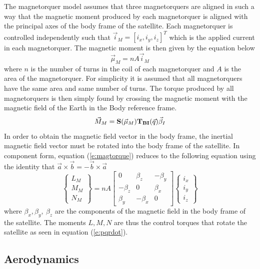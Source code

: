 The magnetorquer model assumes that three magnetorquers are aligned in
such a way that the magnetic moment produced by each magnetorquer is
aligned with the principal axes of the body frame of the
satellite. Each magnetorquer is controlled independently such that
$\vec{i}_M = [i_x,i_y,i_z]^T$ which is the applied current in each
magnetorquer. The magnetic moment is then given by the equation below 
\begin{equation}\label{e:magmoment}
  \vec{\mu}_M = nA\vec{i}_M
\end{equation}
where $n$ is the number of turns in the coil 
of each magnetorquer and $A$ is the area of the magnetorquer. For
simplicity it is assumed that all magnetorquers have the same area and
same number of turns. The torque produced by all magnetorquers is then
simply found by crossing the magnetic moment with the magnetic field
of the Earth in the Body reference frame.
\begin{equation}\label{e:magtorque}
  \vec{M}_M = {\bf S}(\vec{\mu}_M){\bf T_{BI}}(\vec{q})\vec{\beta}_I
\end{equation}
In order to obtain the magnetic field vector in the body frame, the
inertial magnetic field vector must be rotated into the body frame of
the satellite. In component form, equation (\ref{e:magtorque}) reduces to the following
equation using the identity that $\vec{a}\times\vec{b}=-\vec{b}\times\vec{a}$
\begin{equation}\label{e:magtorquecomponent}
  \begin{Bmatrix} L_M \\ M_M \\ N_M \end{Bmatrix} = nA\begin{bmatrix} 0 & \beta_z & -\beta_y \\ -\beta_z & 0 &
  \beta_x \\ \beta_y & -\beta_x & 0 \end{bmatrix}\begin{Bmatrix} i_{x}
    \\ i_{y} \\ i_{z} \end{Bmatrix}
\end{equation}
where $\beta_x,\beta_y,~\beta_z$ are the components of the magnetic
field in the body frame of the satellite. The moments $L,M,N$ are thus
the control torques that rotate the satellite as seen in equation
(\ref{e:pqrdot}).

\subsection{Aerodynamics}\label{s:aerodynamics}


